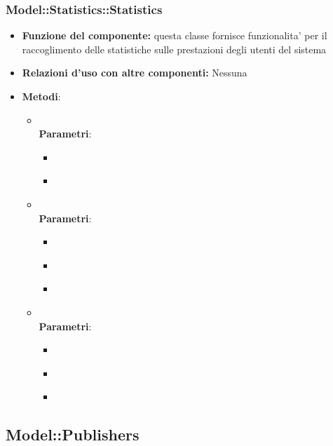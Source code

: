 \begin{itemize}
\subsubsection{Model::Statistics::Statistics}
\begin{itemize}
\item\textbf{Funzione del componente:} questa classe fornisce funzionalita' per il raccoglimento delle statistiche sulle prestazioni degli utenti del sistema
\item\textbf{Relazioni d'uso con altre componenti:} Nessuna\\
\item\textbf{Metodi}:
\begin{itemize}
	\item{}\\
	\textbf{Parametri}:
	\begin{itemize}
		\item{}\\
		\item{}\\
	\end{itemize}
	\item{}\\
	\textbf{Parametri}:
	\begin{itemize}
		\item{}\\
		\item{}\\
		\item{}\\
	\end{itemize}
	\item{}\\
	\textbf{Parametri}:
	\begin{itemize}
		\item{}\\
		\item{}\\
		\item{}\\
	\end{itemize}
\end{itemize}
\end{itemize}

\subsection{Model::Publishers}

\end{itemize}
